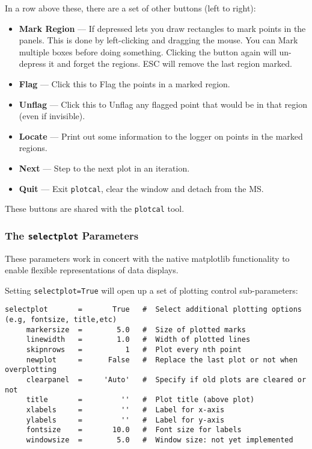 In a row above these, there are a set of other buttons (left to right):
\begin{itemize}
\item {\bf Mark Region} --- If depressed lets you draw rectangles to
  mark points in the panels.  This is done by left-clicking and
  dragging the mouse.  You can Mark multiple boxes before doing
  something.  Clicking the button again will un-depress it and forget
  the regions.  ESC will remove the last region marked.
\item {\bf Flag} --- Click this to Flag the points in a marked region.
\item {\bf Unflag} --- Click this to Unflag any flagged point that
  would be in that region (even if invisible).
\item {\bf Locate} --- Print out some information to the logger on
  points in the marked regions.  
\item {\bf Next} --- Step to the next plot in an iteration.
\item {\bf Quit} --- Exit {\tt plotcal}, clear the window and detach from the MS.
\end{itemize}

These buttons are shared with the {\tt plotcal} tool.

\subsubsection{The {\tt selectplot} Parameters}
\label{section:edit.plot.plotxy.select}

These parameters work in concert with the native matplotlib
functionality to enable flexible representations of data displays. 

Setting {\tt selectplot=True} will open up a set of plotting control
sub-parameters:
\small
\begin{verbatim}
selectplot       =       True   #  Select additional plotting options (e.g, fontsize, title,etc)
     markersize  =        5.0   #  Size of plotted marks
     linewidth   =        1.0   #  Width of plotted lines
     skipnrows   =          1   #  Plot every nth point
     newplot     =      False   #  Replace the last plot or not when overplotting
     clearpanel  =     'Auto'   #  Specify if old plots are cleared or not
     title       =         ''   #  Plot title (above plot)
     xlabels     =         ''   #  Label for x-axis
     ylabels     =         ''   #  Label for y-axis
     fontsize    =       10.0   #  Font size for labels
     windowsize  =        5.0   #  Window size: not yet implemented
\end{verbatim}
\normalsize


